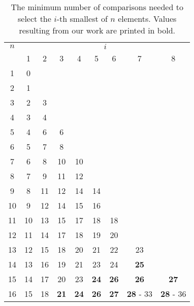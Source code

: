 \documentclass[twoside,leqno,twocolumn]{article}
\begin{document}
\begin{table}[!t]
  \renewcommand{\arraystretch}{1.1}
  \caption{The minimum number of comparisons needed to select the $i$-th smallest of $n$ elements.
  Values resulting from our work are printed in bold.}
  \label{table:num-comparisons}
  \centering
  \small
  \begin{tabular}{c|cccccccc}
    $n$ & \multicolumn{8}{c}{$i$}                                              \\
        & 1                       & 2  & 3  & 4  & 5  & 6  & 7       & 8       \\ \hline
    1   & 0                                                                    \\
    2   & 1                                                                    \\
    3   & 2                       & 3                                          \\
    4   & 3                       & 4                                          \\
    5   & 4                       & 6  & 6                                     \\
    6   & 5                       & 7  & 8                                     \\
    7   & 6                       & 8  & 10 & 10                               \\
    8   & 7                       & 9  & 11 & 12                               \\
    9   & 8                       & 11 & 12 & 14 & 14                          \\
    10  & 9                       & 12 & 14 & 15 & 16                          \\
    11  & 10                      & 13 & 15 & 17 & 18 & 18                     \\
    12  & 11                      & 14 & 17 & 18 & 19 & 20                     \\
    13  & 12                      & 15 & 18 & 20 & 21 & 22 & 23                \\
    14  & 13                      & 16 & 19 & 21 & 23 & 24 & \textbf{25}                \\
    15  & 14                      & 17 & 20 & 23 & \textbf{24} & \textbf{26} & \textbf{26}      & \textbf{27}      \\
    16  & 15                      & 18 & \textbf{21} & \textbf{24} & \textbf{26} & \textbf{27} & \textbf{28} - 33 & \textbf{28} - 36 \\
  \end{tabular}
\end{table}
\end{document}
